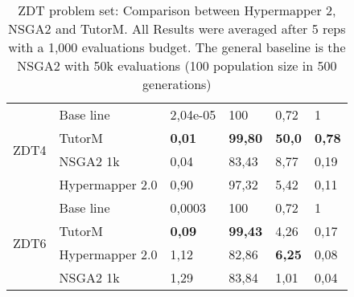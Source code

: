 \begin{table}[]
{\begin{tabular}{@{}llllll@{}}
    \multirow{4}{*}{ZDT4} & Base line       & 2,04e-05          & 100            & 0,72           & 1             \\ \cmidrule(l){2-6} 
                          & TutorM          & \textbf{0,01}     & \textbf{99,80} & \textbf{50,0}  & \textbf{0,78} \\ \cmidrule(l){2-6} 
                          & NSGA2 1k        & 0,04              & 83,43          & 8,77           & 0,19          \\ \cmidrule(l){2-6} 
                          & Hypermapper 2.0 & 0,90              & 97,32          & 5,42           & 0,11          \\ \midrule
    \multirow{4}{*}{ZDT6} & Base line       & 0,0003            & 100            & 0,72           & 1             \\ \cmidrule(l){2-6} 
                          & TutorM          & \textbf{0,09}     & \textbf{99,43} & 4,26           & 0,17          \\ \cmidrule(l){2-6} 
                          & Hypermapper 2.0 & 1,12              & 82,86          & \textbf{6,25}  & 0,08          \\ \cmidrule(l){2-6} 
                          & NSGA2 1k        & 1,29              & 83,84          & 1,01           & 0,04          \\ \bottomrule
    \end{tabular}%
    }
    \caption{ZDT problem set: Comparison between Hypermapper 2, NSGA2 and TutorM.  All Results were averaged after 5 reps with a 1,000 evaluations budget.
    The general baseline is the NSGA2 with 50k evaluations (100 population size in 500 generations)}
    \label{tab:zdt_sumaary}
    \end{table}